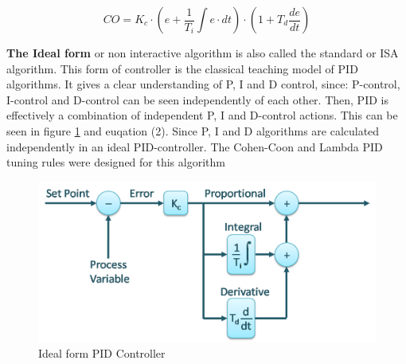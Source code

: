 \begin{equation}
	\label{eqn:1}
	CO = K_c\cdot\left(e + \frac{1}{T_i}\int e\cdot dt \right)\cdot \left(1 + T_d\frac{de}{dt} \right)
\end{equation}




\textbf{The Ideal form} or non interactive algorithm is also called the standard or ISA algorithm. This form of controller is the classical teaching model of PID algorithms. It gives a clear understanding of P, I and D control, since: P-control, I-control and D-control can be seen independently of each other. Then, PID is effectively a combination of independent P, I and D-control actions. This can be seen in figure \ref{figure: Ideal PID} and euqation (2).
Since P, I and D algorithms are calculated independently in an ideal PID-controller. The Cohen-Coon and Lambda PID tuning rules were designed for this algorithm

\begin{figure}[H]
	\centering
	\includegraphics[width=0.8\columnwidth]{Figures/ideal.png}
	\caption[Short title]{Ideal form PID Controller \cite{PID}}
	\label{figure: Ideal PID}
\end{figure}

